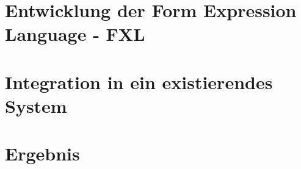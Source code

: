 \documentclass [11pt,smallheadings, a4paper]{report}
\begin{document}
\part{Entwicklung der Form Expression Language - FXL}
\label{part_entwicklung}


\part{Integration in ein existierendes System}
\label{part_integration}


\part{Ergebnis}
\label{part_ergebnis}




%



\begin{flushleft}


\end{flushleft}


\listoftables
\listoffigures
\lstlistoflistings

\appendix

\end{document}
